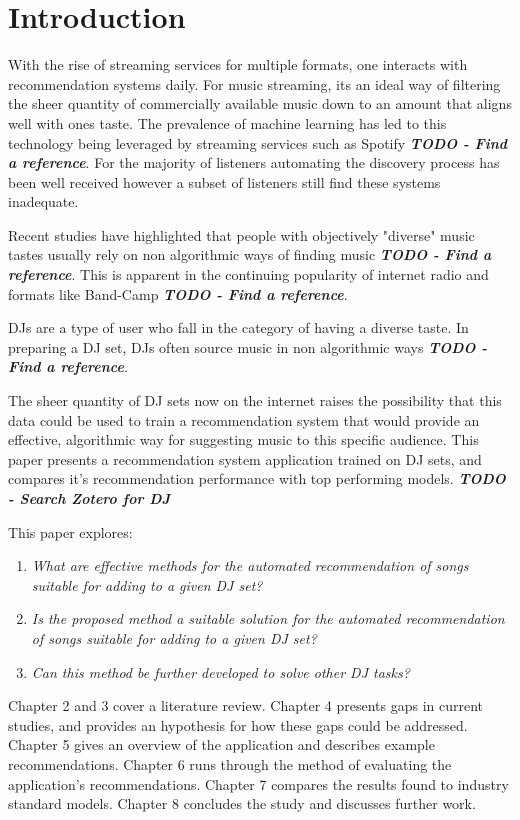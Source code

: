 
\graphicspath{{Chapter1/}}


\chapter{Introduction}
With the rise of streaming services for multiple formats, one interacts with recommendation systems daily. For music streaming, its an ideal way of filtering the sheer quantity of commercially available music down to an amount that aligns well with ones taste. The prevalence of machine learning has led to this technology being leveraged by streaming services such as Spotify \textbf{\textit{TODO - Find a reference}}. For the majority of listeners automating the discovery process has been well received however a subset of listeners still find these systems inadequate.

Recent studies have highlighted that people with objectively "diverse" music tastes usually rely on non algorithmic ways of finding music \textbf{\textit{TODO - Find a reference}}. This is apparent in the continuing popularity of internet radio and formats like Band-Camp \textbf{\textit{TODO - Find a reference}}. 

DJs are a type of user who fall in the category of having a diverse taste. In preparing a DJ set, DJs often source music in non algorithmic ways \textbf{\textit{TODO - Find a reference}}.

 The sheer quantity of DJ sets now on the internet raises the possibility that this data could be used to train a recommendation system that would provide an effective, algorithmic way for suggesting music to this specific audience. This paper presents a recommendation system application trained on DJ sets, and compares it's recommendation performance with top performing models. \textbf{\textit{TODO - Search Zotero for DJ}}

This paper explores:

\begin{enumerate}
	\item \textit{What are effective methods for the automated recommendation of songs suitable
		for adding to a given DJ set?}
	\item \textit{Is the proposed method a suitable solution for the automated recommendation of songs suitable for adding to a given DJ set?}
	\item \textit{Can this method be further developed to solve other DJ tasks?}
\end{enumerate}

Chapter 2 and 3 cover a literature review. Chapter 4 presents gaps in current studies, and provides an hypothesis for how these gaps could be addressed. Chapter 5 gives an overview of the application and describes example recommendations. Chapter 6 runs through the method of evaluating the application's recommendations. Chapter 7 compares the results found to industry standard models. Chapter 8 concludes the study and discusses further work.
 